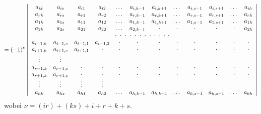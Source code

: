 \[
= (-1)^{\nu}
\left|
\begin{array}{cccccccccccc}
a_{ik} & a_{is} & a_{i1} & a_{i2} & \dots & a_{i,k-1} & a_{i,k+1} & \dots & a_{i,s-1} & a_{i,s+1} & \dots & a_{ih} \\
a_{rk} & a_{rs} & a_{r1} & a_{r2} & \dots & a_{r,k-1} & a_{r,k+1} & \dots & a_{r,s-1} & a_{r,s+1} & \dots & a_{rh} \\
a_{1k} & a_{1s} & a_{11} & a_{12} & \dots & a_{1,k-1} & a_{1,k+1} & \dots & a_{1,s-1} & a_{1,s+1} & \dots & a_{1h} \\
a_{2k} & a_{2s} & a_{21} & a_{22} & \dots & a_{2,k-1} & \cdot & \cdot & \cdot & \cdot & \cdot & a_{2h} \\
\multicolumn{12}{c}{\cdot\ \cdot\ \cdot\ \cdot\ \cdot\ \cdot\ \cdot\ \cdot\ \cdot\ \cdot\ \cdot\ \cdot} \\
a_{i-1,k} & a_{i-1,s} & a_{i-1,1} & a_{i-1,2} & \cdot & \cdot & \cdot & \cdot & \cdot & \cdot & \cdot & \cdot \\
a_{i+1,k} & a_{i+1,s} & a_{i+1,1} & \cdot & \cdot & \cdot & \cdot & \cdot & \cdot & \cdot & \cdot & \cdot \\
\vdots & \vdots & & & & & & & & & & \\
a_{r-1,k} & a_{r-1,s} & \cdot & \cdot & \cdot & \cdot & \cdot & \cdot & \cdot & \cdot & \cdot & \cdot \\
a_{r+1,k} & a_{r+1,s} & \cdot & \cdot & \cdot & \cdot & \cdot & \cdot & \cdot & \cdot & \cdot & \cdot \\
\vdots & \vdots & \vdots & \vdots & & & & & & & & \\
a_{hk} & a_{hs} & a_{h1} & a_{h2} & \dots & a_{h,k-1} & a_{h,k+1} & \dots & a_{h,s-1} & a_{h,s+1} & \dots & a_{hh}
\end{array}
\right|
\]
wobei $\nu = (ir) + (ks) + i + r + k + s.$

